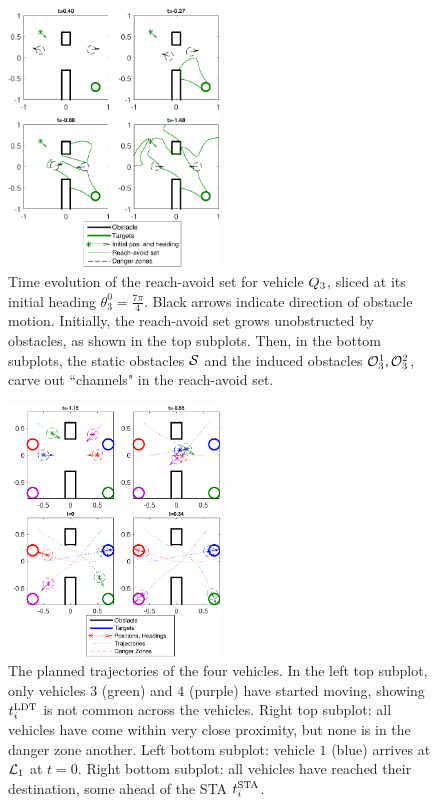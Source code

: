 \begin{figure}
	\centering
	\includegraphics[width=0.5\textwidth]{"fig/dubins_reach_3"}
	\caption{Time evolution of the reach-avoid set for vehicle $Q_{3}$, sliced at its initial heading $\theta_3^0=\frac{7\pi}{4}$. Black arrows indicate direction of obstacle motion. Initially, the reach-avoid set grows unobstructed by obstacles, as shown in the top subplots. Then, in the bottom subplots, the static obstacles $\mathcal{S}$ and the induced obstacles $\mathcal{O}_3^1,\mathcal{O}_3^2$, carve out ``channels" in the reach-avoid set.}
	\label{fig:dubins_reach_3}
\end{figure}

\begin{figure}
	\centering
	\includegraphics[width=0.5\textwidth]{"fig/dubins_result"}
	\caption{The planned trajectories of the four vehicles. In the left top subplot, only vehicles $3$ (green) and $4$ (purple) have started moving, showing $t^\text{LDT}_i$ is not common across the vehicles. Right top subplot: all vehicles have come within very close proximity, but none is in the danger zone another. Left bottom subplot: vehicle $1$ (blue) arrives at $\mathcal{L}_1$ at $t=0$. Right bottom subplot: all vehicles have reached their destination, some ahead of the STA $t^\text{STA}_i$.}
	\label{fig:dubins_result}
\end{figure}